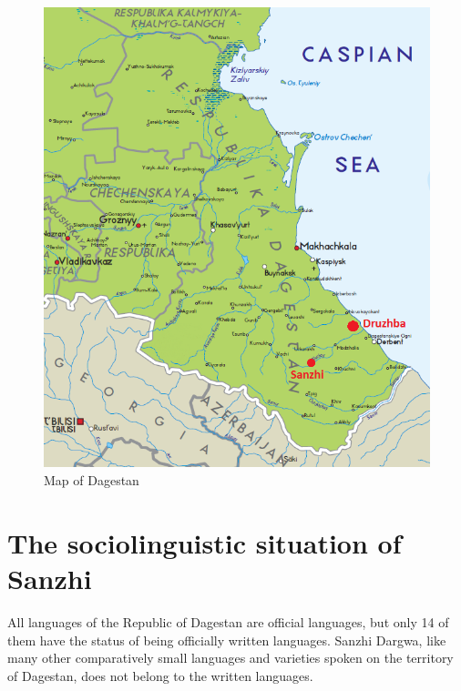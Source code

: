 \begin{figure}[t!]
	\caption{Map of Dagestan}
	\label{fig:Map 2}
	\includegraphics[scale=0.7]{figures/Dagestan_Sanzhi.png}
\end{figure}


\section{The sociolinguistic situation of Sanzhi}
\label{sec:The sociolinguistic situation of Sanzhi}

All languages of the Republic of Dagestan are official languages, but only 14 of them have the status of being officially written languages. Sanzhi Dargwa, like many other comparatively small languages and varieties spoken on the territory of Dagestan, does not belong to the written languages.  

